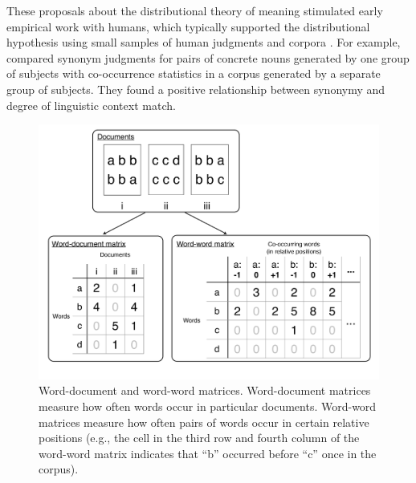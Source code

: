 \documentclass[man,longtable,floatsintext]{my-apa6}
\begin{document}
These proposals about the distributional theory of meaning stimulated early empirical work with humans, which typically supported the distributional hypothesis using small samples of human judgments and corpora \citep{rubenstein1965, clark1968, stefflre1971, geffroy1973, berryrogghe1973, szalay1974}. For example, \citet{rubenstein1965} compared synonym judgments for pairs of concrete nouns generated by one group of subjects with co-occurrence statistics in a corpus generated by a separate group of subjects. They found a positive relationship between synonymy and degree of linguistic context match.

\begin{figure}[t]
  \begin{center}
    \includegraphics[width=0.9\linewidth]{matrices}
  \end{center}
  \caption{Word-document and word-word matrices. Word-document matrices measure how often words occur in particular documents. Word-word matrices measure how often pairs of words occur in certain relative positions (e.g., the cell in the third row and fourth column of the word-word matrix indicates that ``b'' occurred before ``c'' once in the corpus).}
  \label{matrices}
\end{figure}
\end{document}
